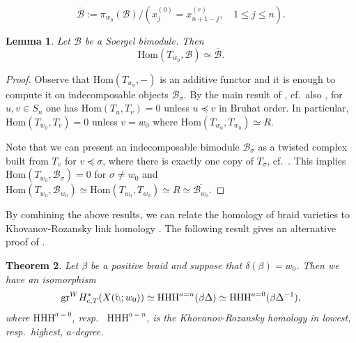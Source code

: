 \documentclass[10pt]{amsart}
\theoremstyle{plain}
\newtheorem{thm}{Theorem}[section]
\newtheorem{lemma}[thm]{Lemma}
\theoremstyle{definition}
\theoremstyle{remark}
\numberwithin{equation}{section}
\newcommand{\SB}{\mathscr{B}}
\newcommand{\HHH}{\mathrm{HHH}}
\newcommand{\Hom}{\mathrm{Hom}}
\DeclareRobustCommand{\ateb}{\text{\reflectbox{$\beta$}}}
\begin{document}
$$\overline{\SB}:=\pi_{w_0}(\SB)/\left(x^{(0)}_{j}=x^{(r)}_{n+1-j},\quad 1\le j\le n\right).$$

\begin{lemma}
\label{lem: hom from w_0}
Let $\SB$ be a Soergel bimodule. Then
$$\Hom(T_{w_0},\SB)\simeq \overline{\SB}.$$
\end{lemma}

\begin{proof}
Observe that $\Hom(T_{w_0},-)$ is an additive functor and it is enough to compute it on indecomposable objects $\SB_{\sigma}$. By the main result of \cite{LW}, cf.~also \cite[Corollary A.6]{GHMN}, for $u,v\in S_n$ one has $\Hom(T_u,T_v)=0$ unless $u\preceq v$ in Bruhat order. In particular, $\Hom(T_{w_0},T_v)=0$ unless $v=w_0$ where $\Hom(T_{w_0},T_{w_0})\simeq R$. 

\noindent Note that we can present an indecomposable bimodule $\SB_{\sigma}$ as a twisted complex built from $T_v$ for $v\preceq \sigma$, where there is exactly one copy of $T_{\sigma}$, cf.~\cite{LW,soergelbook}. This implies $\Hom(T_{w_0},\SB_{\sigma})=0$ for $\sigma\neq w_0$ and $\Hom(T_{w_0},\SB_{w_0})\simeq \Hom(T_{w_0},T_{w_0})\simeq R \simeq \overline{\SB_{w_0}}$. 
\end{proof}

\noindent By combining the above results, we can relate the homology of braid varieties to 
Khovanov-Rozansky link homology \cite{KhS,KR}.
The following result gives an alternative proof of 
\cite[Corollary 4]{trinh2021hecke}.

\begin{thm}
Let $\beta$ be a positive braid and suppose that $\delta(\beta)=w_0$. Then we have an isomorphism
$$\mathrm{gr}^{W}H_{c,T}^{*}(X(\ateb;w_0))\simeq \HHH^{a=n}(\beta\Delta)\simeq \HHH^{a=0}(\beta\Delta^{-1}),
  $$
where $\HHH^{a=0}$, resp.~ $\HHH^{a=n}$, is the Khovanov-Rozansky homology in lowest, resp.~highest, $a$-degree.
\end{thm}
\end{document}
